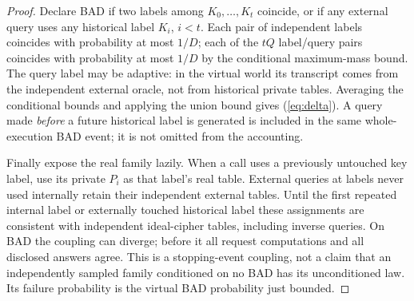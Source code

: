 \documentclass[11 pt,a 4 paper]{article}
\begin{document}
\begin{proof}
Declare BAD if two labels among $ K_0,\ldots,K_t $ coincide, or if any external query uses any historical label $ K_i $, $ i<t $. Each pair of independent labels coincides with probability at most $1/D $; each of the $ tQ $ label/query pairs coincides with probability at most $1/D $ by the conditional maximum-mass bound. The query label may be adaptive: in the virtual world its transcript comes from the independent external oracle, not from historical private tables. Averaging the conditional bounds and applying the union bound gives (\ref{eq:delta}). A query made \emph{before} a future historical label is generated is included in the same whole-execution BAD event; it is not omitted from the accounting.

Finally expose the real family lazily. When a call uses a previously untouched key label, use its private $ P_i $ as that label's real table. External queries at labels never used internally retain their independent external tables. Until the first repeated internal label or externally touched historical label these assignments are consistent with independent ideal-cipher tables, including inverse queries. On BAD the coupling can diverge; before it all request computations and all disclosed answers agree. This is a stopping-event coupling, not a claim that an independently sampled family conditioned on no BAD has its unconditioned law. Its failure probability is the virtual BAD probability just bounded.
\end{proof}
\end{document}
